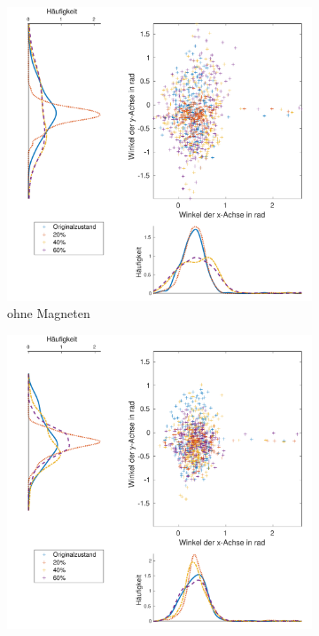 \begin{figure}[tb]
	\centering
	\begin{adjustwidth}{-0.2\linewidth}{-0.2\linewidth}
		\hspace{45pt}
		\begin{subfigure}[c]{.45\linewidth}
			\centering
			\includegraphics[width=\linewidth]{Bilder/Winkel_Grund_20_40_60_ohneM.pdf}
			\caption{ohne Magneten}
			\vspace{5pt}
		\end{subfigure}
		\hspace{-20pt}
		\begin{subfigure}[c]{.45\linewidth}
			\centering
			\includegraphics[width=\linewidth]{Bilder/Winkel_Grund_20_40_60_mitM.pdf}

\end{subfigure}
\end{adjustwidth}
\end{figure}
